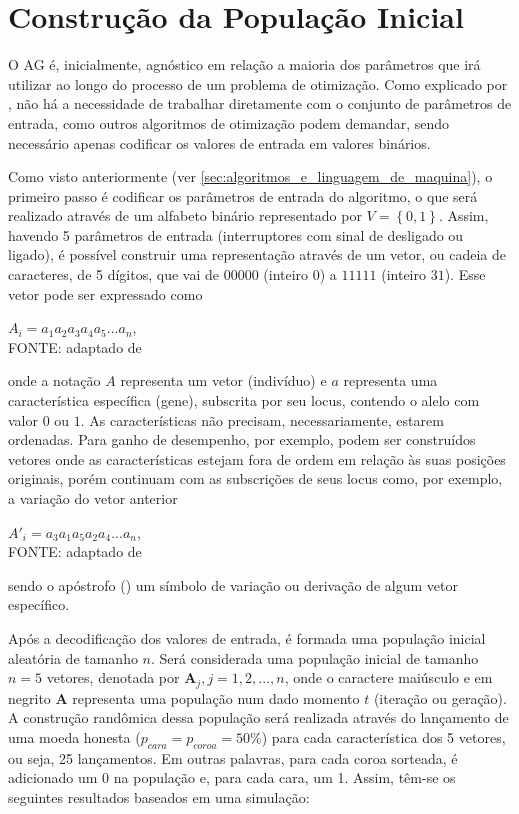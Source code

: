 \section{Construção da População Inicial}

O AG é, inicialmente, agnóstico em relação a maioria dos parâmetros que irá utilizar ao longo do processo de um problema de otimização. Como explicado por \citet[pg.8]{goldberg_genetic_1989}, não há a necessidade de trabalhar diretamente com o conjunto de parâmetros de entrada, como outros algoritmos de otimização podem demandar, sendo necessário apenas codificar os valores de entrada em valores binários.

Como visto anteriormente (ver \autoref{sec:algoritmos_e_linguagem_de_maquina}), o primeiro passo é codificar os parâmetros de entrada do algoritmo, o que será realizado através de um alfabeto binário representado por $V = \left\{0,1\right\}$. Assim, havendo 5 parâmetros de entrada (interruptores com sinal de desligado ou ligado), é possível construir uma representação através de um vetor, ou cadeia de caracteres, de 5 dígitos, que vai de $00000$ (inteiro $0$) a $11111$ (inteiro $31$). Esse vetor pode ser expressado como

\begin{center}
	$A_i = a_1a_2a_3a_4a_5 ... a_n$, \\
	FONTE: adaptado de \citet[pg.25]{goldberg_genetic_1989}
\end{center}

\noindent onde a notação $A$ representa um vetor (indivíduo) e $a$ representa uma característica específica (gene), subscrita por seu locus, contendo o alelo com valor $0$ ou $1$. As características não precisam, necessariamente, estarem ordenadas. Para ganho de desempenho, por exemplo, podem ser construídos vetores onde as características estejam fora de ordem em relação às suas posições originais, porém continuam com as subscrições de seus locus como, por exemplo, a variação do vetor anterior

\begin{center}
	$A'_i = a_3a_1a_5a_2a_4 ... a_n$, \\
	FONTE: adaptado de \citet[pg.25]{goldberg_genetic_1989}
\end{center}

\noindent sendo o apóstrofo (\textquotesingle) um símbolo de variação ou derivação de algum vetor específico.

Após a decodificação dos valores de entrada, é formada uma população inicial aleatória de tamanho $n$. Será considerada uma população inicial de tamanho $n = 5$ vetores, denotada por $\textbf{A}_j, j = 1, 2, ..., n$, onde o caractere maiúsculo e em negrito $\textbf{A}$ representa uma população num dado momento $t$ (iteração ou geração). A construção randômica dessa população será realizada através do lançamento de uma moeda honesta ($p_{cara} = p_{coroa} = 50\%$) para cada característica dos 5 vetores, ou seja, 25 lançamentos. Em outras palavras, para cada coroa sorteada, é adicionado um 0 na população e, para cada cara, um 1. Assim, têm-se os seguintes resultados baseados em uma simulação:

